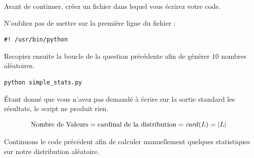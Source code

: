 \documentclass[11pt,a4paper]{article}
\begin{document}
\bigskip

Avant de continuer, créez un fichier  dans lequel vous écrirez votre code.

N'oubliez pas de mettre sur la première ligne du fichier :

\begin{center}
\begin{lstlisting}[style=sh,morekeywords={floor,ceil}]
#! /usr/bin/python \end{lstlisting}
\end{center}

Recopiez ensuite la boucle  de la question précédente afin de générer $ 10 $ nombres aléatoires.


\begin{center}
\begin{lstlisting}[style=sh,morekeywords={floor,ceil}]
python simple_stats.py \end{lstlisting}
\end{center}

\'Etant donné que vous n'avez pas demandé à écrire sur la sortie standard les résultats, le script ne produit rien.


\begin{center}
\begin{equation*}
\text{Nombre de Valeurs} = \text{cardinal de la distribution} = \text{\textit{card}}(L) = |L|
\end{equation*}
\end{center}


\bigskip

Continuons le code précédent afin de calculer manuellement quelques statistiques sur notre distribution aléatoire.

\bigskip



\end{document}
